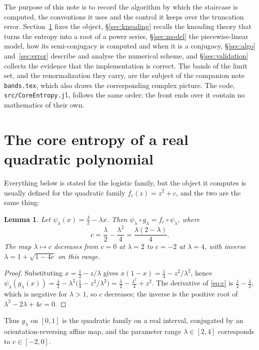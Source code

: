 \documentclass[11pt]{article}
\theoremstyle{plain}
\newtheorem{lemma}[theorem]{Lemma}
\theoremstyle{definition}
\begin{document}
The purpose of this note is to record the algorithm by which the staircase is computed,
the conventions it uses and the control it keeps over the truncation error.
Section~\ref{sec:core} fixes the object, \S\ref{sec:kneading} recalls the kneading theory
that turns the entropy into a root of a power series, \S\ref{sec:model} the piecewise-linear
model, how its semi-conjugacy is computed and when it is a conjugacy, \S\ref{sec:algo}
and~\ref{sec:error} describe
and analyse the numerical scheme, and \S\ref{sec:validation} collects the evidence that the
implementation is correct.  The bands of the limit set, and the renormalization they carry,
are the subject of the companion note \texttt{bands.tex}, which also draws
the corresponding complex picture.  The code,
\texttt{src/CoreEntropy.jl}, follows the same order; the front ends over it contain no
mathematics of their own.

\section{The core entropy of a real quadratic polynomial}\label{sec:core}

Everything below is stated for the logistic family, but the object it computes is usually
defined for the quadratic family $f_c(z)=z^2+c$, and the two are the same thing:

\begin{lemma}\label{lem:conj}
Let $\psi_\lambda(x)=\tfrac{\lambda}{2}-\lambda x$.  Then
$\psi_\lambda\circ g_\lambda=f_c\circ\psi_\lambda$, where
\begin{equation}\label{eq:c}
  c=\frac{\lambda}{2}-\frac{\lambda^2}{4}=\frac{\lambda(2-\lambda)}{4}.
\end{equation}
The map $\lambda\mapsto c$ decreases from $c=0$ at $\lambda=2$ to $c=-2$ at $\lambda=4$,
with inverse $\lambda=1+\sqrt{1-4c}$ on this range.
\end{lemma}

\begin{proof}
Substituting $x=\tfrac12-z/\lambda$ gives $x(1-x)=\tfrac14-z^2/\lambda^2$, hence
$\psi_\lambda(g_\lambda(x))=\tfrac{\lambda}{2}-\lambda^2\bigl(\tfrac14-z^2/\lambda^2\bigr)
=\tfrac{\lambda}{2}-\tfrac{\lambda^2}{4}+z^2$.  The derivative of \eqref{eq:c} is
$\tfrac12-\tfrac{\lambda}{2}$, which is negative for $\lambda>1$, so $c$ decreases; the
inverse is the positive root of $\lambda^2-2\lambda+4c=0$.
\end{proof}

Thus $g_\lambda$ on $[0,1]$ is the quadratic family on a real interval, conjugated by an
orientation-reversing affine map, and the parameter range $\lambda\in[2,4]$ corresponds to
$c\in[-2,0]$.
\end{document}
